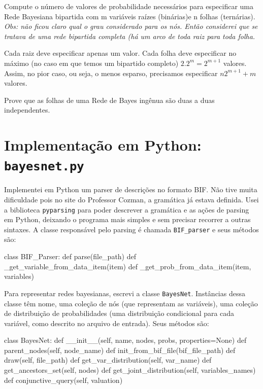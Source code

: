 \documentclass[paper=a4, fontsize=11pt]{scrartcl} %
\newenvironment{exerc}[1][Exercício]{\begin{trivlist}
\item[\hskip \labelsep {\bfseries #1}]}{\end{trivlist}}
\numberwithin{equation}{subsection}
\numberwithin{figure}{subsection}
\numberwithin{table}{subsection}
\numberwithin{definition}{subsection}
\numberwithin{theorem}{subsection}
\numberwithin{property}{subsection}
\numberwithin{proposition}{subsection}
\numberwithin{equation}{section}
\numberwithin{figure}{section}
\numberwithin{table}{section}
\numberwithin{definition}{section}
\numberwithin{theorem}{section}
\numberwithin{property}{section}
\numberwithin{proposition}{section}
\begin{document}
\begin{exerc}
Compute o número de valores de probabilidade necessários para especificar uma Rede Bayesiana bipartida com m variáveis raízes (binárias)e n folhas (ternárias). \emph{Obs: não ficou claro qual o grau considerado para os nós. Então considerei que se tratava de uma rede bipartida completa (há um arco de toda raiz para toda folha.}

Cada raiz deve especificar apenas um valor. Cada folha deve especificar no máximo (no caso em que temos um bipartido completo) $2.2^m = 2^{m+1}$ valores. Assim, no pior caso, ou seja, o menos esparso, precisamos especificar $n2^{m+1} + m$ valores.
\end{exerc}

\begin{exerc}
Prove que as folhas de uma Rede de Bayes ingênua são duas a duas independentes.

\end{exerc}

\pagebreak  
\section{Implementação em Python: \texttt{bayesnet.py}}

Implementei em Python um parser de descrições no formato BIF. Não tive muita dificuldade pois no site do Professor Cozman, a gramática já estava definida. Usei a biblioteca \verb|pyparsing| para poder descrever a gramática e as ações de parsing em Python, deixando o programa mais simples e sem precisar recorrer a outras sintaxes. A classe responsável pelo parsing é chamada \verb|BIF_parser| e seus métodos são:

\begin{python}
class BIF_Parser:
  def parse(file_path)
  def _get_variable_from_data_item(item)
  def _get_prob_from_data_item(item, variables)
\end{python}

Para representar redes bayesianas, escrevi a classe \verb|BayesNet|. Instâncias dessa classe têm nome, uma coleção de nós (que representam as variáveis), uma coleção de distribuição de probabilidades (uma distribuição condicional para cada variável, como descrito no arquivo de entrada). Seus métodos são:

\begin{python}
class BayesNet:
  def __init__(self, name, nodes, probs, properties=None)
  def parent_nodes(self, node_name)
  def init_from_bif_file(bif_file_path)
  def draw(self, file_path)
  def get_var_distribution(self, var_name)
  def get_ancestors_set(self, nodes)
  def get_joint_distribution(self, variables_names)
  def conjunctive_query(self, valuation)
\end{python}
\end{document}
